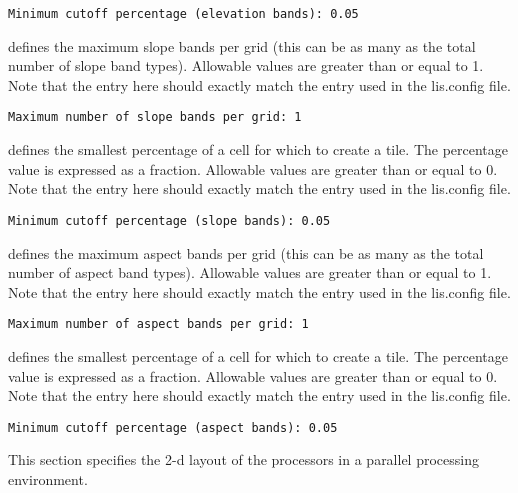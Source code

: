  \begin{Verbatim}[frame=single]
Minimum cutoff percentage (elevation bands): 0.05
 \end{Verbatim}

 
  defines the
 maximum slope bands per grid (this can be as many as the total
 number of slope band types). 
 Allowable values are greater than or equal to 1. Note that the entry
 here should exactly match the entry used in the lis.config file. 
 

 \begin{Verbatim}[frame=single]
Maximum number of slope bands per grid: 1
 \end{Verbatim}

 
  defines the
 smallest percentage of a cell for which to create a tile.
 The percentage value is expressed as a fraction.
 Allowable values are greater than or equal to 0. Note that the entry
 here should exactly match the entry used in the lis.config file. 
 

 \begin{Verbatim}[frame=single]
Minimum cutoff percentage (slope bands): 0.05
 \end{Verbatim}

 
  defines the
 maximum aspect bands per grid (this can be as many as the total
 number of aspect band types). 
 Allowable values are greater than or equal to 1. Note that the entry
 here should exactly match the entry used in the lis.config file. 
 

 \begin{Verbatim}[frame=single]
Maximum number of aspect bands per grid: 1
 \end{Verbatim}

 
  defines the
 smallest percentage of a cell for which to create a tile.
 The percentage value is expressed as a fraction.
 Allowable values are greater than or equal to 0. Note that the entry
 here should exactly match the entry used in the lis.config file. 
 

 \begin{Verbatim}[frame=single]
Minimum cutoff percentage (aspect bands): 0.05
 \end{Verbatim}


 
 This section specifies the 2-d layout of the processors in a
 parallel processing environment. 

